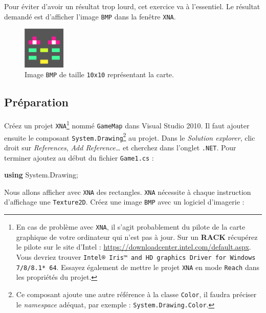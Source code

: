 \documentclass[11pt, a4paper]{article}
\newenvironment{Shaded}{}{}
\newcommand{\KeywordTok}[1]{\textcolor[rgb]{0.00,0.44,0.13}{\textbf{{#1}}}}
\newcommand{\FunctionTok}[1]{\textcolor[rgb]{0.02,0.16,0.49}{{#1}}}
\newcommand{\NormalTok}[1]{{#1}}
\begin{document}
Pour éviter d'avoir un résultat trop lourd, cet exercice va à
l'essentiel. Le résultat demandé est d'afficher l'image \texttt{BMP}
dans la fenêtre \texttt{XNA}.

\begin{figure}[h]
\begin{center}
\includegraphics[width=2cm]{../res/mapbmp.png}
\end{center}
\caption{Image \texttt{BMP} de taille \texttt{10x10} représentant la carte.}
\end{figure}

\subsection{Préparation}\label{pruxe9paration}

Créez un projet
\texttt{XNA}\footnote{En cas de problème avec \texttt{XNA}, il s'agit probablement du pilote de la carte graphique de votre ordinateur qui n'est pas à jour. Sur un \textbf{RACK} récupérez le pilote sur le site d'Intel : \url{https://downloadcenter.intel.com/default.aspx}. Vous devriez trouver \texttt{Intel® Iris™ and HD graphics Driver for Windows 7/8/8.1* 64}. Essayez également de mettre le projet \texttt{XNA} en mode \texttt{Reach} dans les propriétés du projet.}
nommé \texttt{GameMap} dans Visual Studio 2010. Il faut ajouter ensuite
le composant
\texttt{System.Drawing}\footnote{Ce composant ajoute une autre référence à la classe \texttt{Color}, il faudra préciser le \textit{namespace} adéquat, par exemple : \texttt{System.Drawing.Color}.}
au projet. Dans le \emph{Solution explorer}, clic droit sur
\emph{References}, \emph{Add Reference\ldots{}} et cherchez dans
l'onglet \texttt{.NET}. Pour terminer ajoutez au début du fichier
\texttt{Game1.cs} :

\begin{Shaded}
\begin{Highlighting}[]
\KeywordTok{using} \NormalTok{System.}\FunctionTok{Drawing}\NormalTok{;}
\end{Highlighting}
\end{Shaded}

Nous allons afficher avec \texttt{XNA} des rectangles. \texttt{XNA}
nécessite à chaque instruction d'affichage une \texttt{Texture2D}. Créez
une image \texttt{BMP} avec un logiciel d'imagerie :
\end{document}
